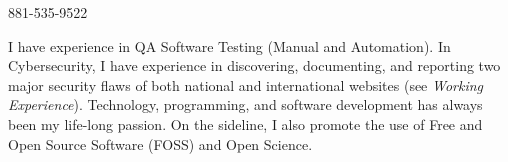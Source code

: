 \documentclass[11pt,a4paper]{article} %
\begin{document}


\noindent\bull{}

\noindent\bull{} 881-535-9522 %

\noindent\bull{}



\noindent I have experience in QA Software Testing (Manual and Automation). In Cybersecurity, I have experience in discovering, documenting, and reporting two
major security flaws of both national and international websites (see \textit{Working Experience}). Technology, programming, and software development has always been my life-long passion.
On the sideline, I also promote the use of Free and Open Source Software (FOSS) and Open Science.

\vspace{-1em} %



\end{document}
